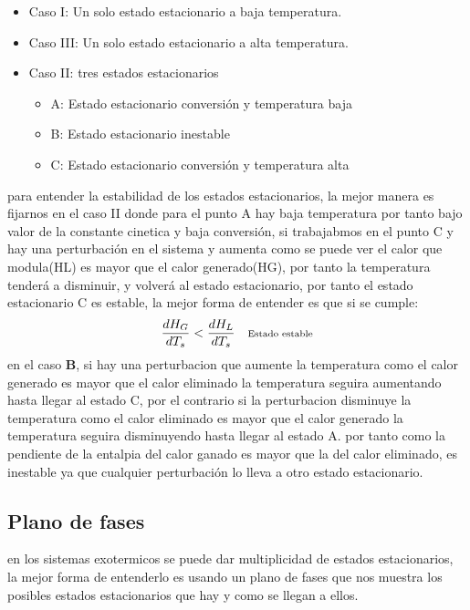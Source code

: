 \begin{itemize}
	\item Caso I: Un solo estado estacionario a baja temperatura.
	\item Caso III: Un solo estado estacionario a alta temperatura.
	\item Caso II: tres estados estacionarios
	      \begin{itemize}
		      \item A: Estado estacionario conversión y temperatura baja
		      \item B: Estado estacionario inestable
		      \item C: Estado estacionario conversión y temperatura alta
	      \end{itemize}
\end{itemize}
para entender la estabilidad de los estados estacionarios, la mejor manera es fijarnos en el caso II donde para el punto A hay baja temperatura por tanto bajo valor de la constante cinetica y baja conversión, si trabajabmos en el punto C y hay una perturbación en el sistema
y aumenta como se puede ver  el calor que modula(HL) es mayor que el calor generado(HG), por tanto la temperatura tenderá a disminuir, y volverá al estado estacionario, por tanto el estado estacionario C es estable,
la mejor forma de entender es que si se cumple:
\begin{equation}
	\frac{dH_G}{dT_s} < \frac{dH_L}{dT_s} \quad \text{\scriptsize Estado estable}
\end{equation}
en el caso \textbf{B}, si hay una perturbacion que aumente la temperatura como el calor generado es mayor que el calor eliminado la temperatura seguira aumentando hasta llegar al estado C, por el contrario si la perturbacion disminuye la temperatura como el calor eliminado es mayor que el calor generado la temperatura seguira disminuyendo hasta llegar al estado A.
por tanto como la pendiente de la entalpia del calor  ganado es mayor que la del calor eliminado, es inestable ya que cualquier perturbación lo lleva a otro estado estacionario.

\subsection{Plano de fases}
en los sistemas exotermicos se puede dar multiplicidad de estados estacionarios, la mejor forma de entenderlo es usando un plano de fases que nos muestra los posibles estados estacionarios que hay y como se llegan a ellos.

